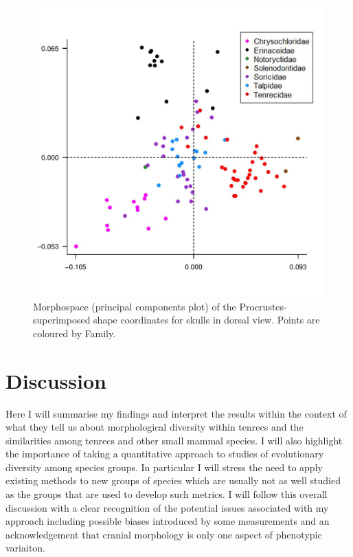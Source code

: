 \documentclass[12pt,a4paper]{article}
\begin{document}
  \begin{figure}[H]
	\centering
	\includegraphics[width=\textwidth, height=\textheight, keepaspectratio=true]{skdors_allfam_PCA_legend.png}
		\caption{Morphospace (principal components plot) of the 		Procrustes-superimposed shape coordinates for skulls in dorsal view. Points are coloured by Family.}
	\label{fig:skdors_pca}
  \end{figure}


\section{Discussion}
	
	Here I will summarise my findings and interpret the results within the context of what they tell us about morphological diversity within tenrecs and the similarities among tenrecs and other small mammal species. I will also highlight the importance of taking a quantitative approach to studies of evolutionary diversity among species groups. In particular I will stress the need to apply existing methods to new groups of species which are usually not as well studied as the groups that are used to develop such metrics. 
	I will follow this overall discussion with a clear recognition of the potential issues associated with my approach including possible biases introduced by some measurements and an acknowledgement that cranial morphology is only one aspect of phenotypic variaiton.
	
\end{document}
